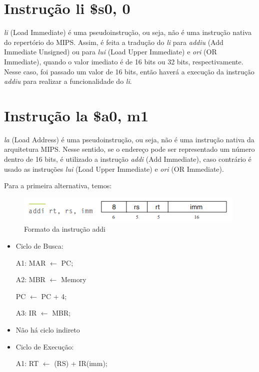 \documentclass[
	12pt,				%
	oneside,			%
	a4paper,			%
	english,			%
	brazil				%
	]{abntex2ppgsi}
\begin{document}
\section{Instrução li \$s0, 0}

\textit{li} (Load Immediate) é uma pseudoinstrução, ou seja, não é uma instrução nativa do repertório do MIPS. Assim, é feita a tradução do \textit{li} para \textit{addiu} (Add Immediate Unsigned) ou para \textit{lui} (Load Upper Immediate) e \textit{ori} (OR Immediate), quando o valor imediato é de 16 bits ou 32 bits, respectivamente. Nesse caso, foi passado um valor de 16 bits, então haverá a execução da instrução \textit{addiu} para realizar a funcionalidade do \textit{li}.

\section{Instrução la \$a0, m1}

\textit{la} (Load Address) é uma pseudoinstrução, ou seja, não é uma instrução nativa da arquitetura MIPS. Nesse sentido, se o endereço pode ser representado um número dentro de 16 bits, é utilizado a instrução \textit{addi} (Add Immediate), caso contrário é usado as instruções \textit{lui} (Load Upper Immediate) e \textit{ori} (OR Immediate).

Para a primeira alternativa, temos:

\begin{figure}[h]
    \centering
    \includegraphics{461.png}
    \caption{Formato da instrução addi}
    \label{fig461}
\end{figure}

\begin{itemize}
    \item Ciclo de Busca:
    
    A1: MAR $\leftarrow$ PC;

    A2: MBR $\leftarrow$ Memory 
    
       PC $\leftarrow$ PC + 4;
    
    A3: IR $\leftarrow$ MBR;
    
    \item Não há ciclo indireto
    \item Ciclo de Execução:
    
    A1: RT $\leftarrow$ (RS) + IR(imm);
\end{itemize}
\end{document}
